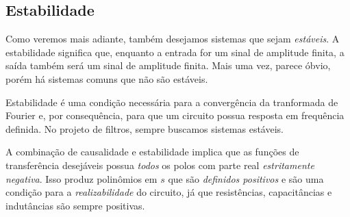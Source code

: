 \subsection{Estabilidade}

Como veremos mais adiante, também desejamos sistemas que sejam \emph{estáveis}. A estabilidade significa que, enquanto a entrada for um sinal de amplitude finita, a saída também será um sinal de amplitude finita. Mais uma vez, parece óbvio, porém há sistemas comuns que não são estáveis.

Estabilidade é uma condição necessária para a convergência da tranformada de Fourier e, por consequência, para que um circuito possua resposta em frequência definida. No projeto de filtros, sempre buscamos sistemas estáveis.

A combinação de causalidade e estabilidade implica que as funções de transferência desejáveis possua \emph{todos} os polos com parte real \emph{estritamente negativa}. Isso produz polinômios em $s$ que são \emph{definidos positivos} e são uma condição para a \emph{realizabilidade} do circuito, já que resistências, capacitâncias e indutâncias são sempre positivas.

